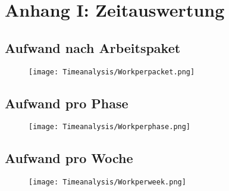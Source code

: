 \chapter{Anhang I: Zeitauswertung}

\section*{Aufwand nach Arbeitspaket}
\begin{figure}[h!]
	\centering
	\texttt{[image: Timeanalysis/Workperpacket.png]}
\end{figure}

\clearpage 

\section*{Aufwand pro Phase}
\begin{figure}[h!]
	\centering
	\texttt{[image: Timeanalysis/Workperphase.png]}
\end{figure}

\section*{Aufwand pro Woche}
\begin{figure}[h!]
	\centering
	\texttt{[image: Timeanalysis/Workperweek.png]}
\end{figure}
